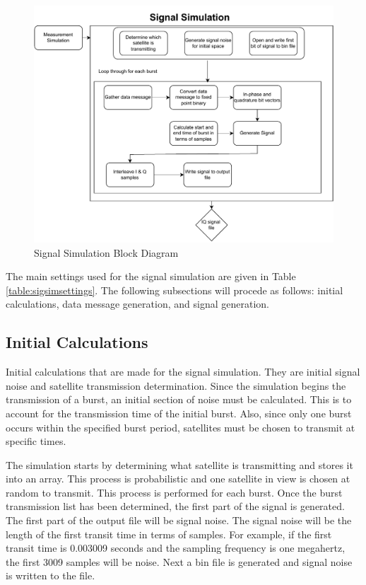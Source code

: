\documentclass[12pt]{report}
\begin{document}
\begin{figure}[h]
    \centering
    \includegraphics[width=5in]{Overall Simulation Diagram-Signal Simulation.drawio.pdf}
    \caption{Signal Simulation Block Diagram}
    \label{fig:SigSimBlock}
\end{figure}

The main settings used for the signal simulation are given in Table \ref{table:sigsimsettings}. The following subsections will procede as follows: initial calculations, data message generation, and signal generation.

\subsection{Initial Calculations}
Initial calculations that are made for the signal simulation. They are initial signal noise and satellite transmission determination. Since the simulation begins the transmission of a burst, an initial section of noise must be calculated. This is to account for the transmission time of the initial burst. Also, since only one burst occurs within the specified burst period, satellites must be chosen to transmit at specific times. 

The simulation starts by determining what satellite is transmitting and stores it into an array. This process is probabilistic and one satellite in view is chosen at random to transmit. This process is performed for each burst. Once the burst transmission list has been determined, the first part of the signal is generated. The first part of the output file will be signal noise. The signal noise will be the length of the first transit time in terms of samples. For example, if the first transit time is 0.003009 seconds and the sampling frequency is one megahertz, the first 3009 samples will be noise. Next a bin file is generated and signal noise is written to the file. 
\end{document}
